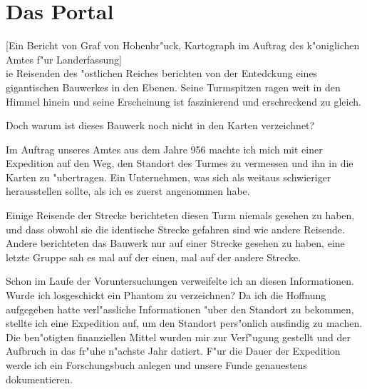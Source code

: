 \section{Das Portal}
\label{dasportal} [Ein Bericht von \mbox{Graf} von
\mbox{Hohenbr"uck}, Kartograph im Auftrag des k"oniglichen Amtes
f"ur Landerfassung]\\

ie Reisenden
des "ostlichen Reiches berichten von der Entedckung eines
gigantischen Bauwerkes in den Ebenen. Seine Turmspitzen ragen weit
in den Himmel hinein und seine Erscheinung ist faszinierend und
erschreckend zu gleich.

\par Doch warum ist dieses Bauwerk noch nicht in den Karten verzeichnet?

\par Im Auftrag unseres Amtes aus dem Jahre 956 machte ich mich mit
einer Expedition auf den Weg, den Standort des Turmes zu vermessen
und ihn in die Karten zu "ubertragen. Ein Unternehmen, was sich als
weitaus schwieriger herausstellen sollte, als ich es zuerst
angenommen habe.

Einige Reisende der Strecke berichteten diesen Turm niemals gesehen
zu haben, und dass obwohl sie die identische Strecke gefahren sind
wie andere Reisende. Andere berichteten das Bauwerk nur auf einer
Strecke gesehen zu haben, eine letzte Gruppe sah es mal auf der
einen, mal auf der andere Strecke.

Schon im Laufe der Voruntersuchungen verweifelte ich an diesen
Informationen. Wurde ich losgeschickt ein Phantom zu verzeichnen? Da
ich die Hoffnung aufgegeben hatte verl"assliche Informationen "uber
den Standort zu bekommen, stellte ich eine Expedition auf, um den
Standort pers"onlich ausfindig zu machen. Die ben"otigten
finanziellen Mittel wurden mir zur Verf"ugung gestellt und der
Aufbruch in das fr"uhe n"achste Jahr datiert. F"ur die Dauer der
Expedition werde ich ein Forschungsbuch anlegen und unsere Funde
genauestens dokumentieren.


